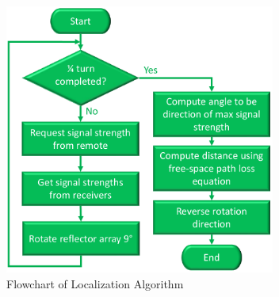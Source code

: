 \begin{figure}[H]
    \centering
    \includegraphics[width=3.5in]{figs/localizationAlgorithmFlowchart.pdf}
    \caption{Flowchart of Localization Algorithm}
    \label{fig:localizationAlgoFlowchart}
\end{figure}

